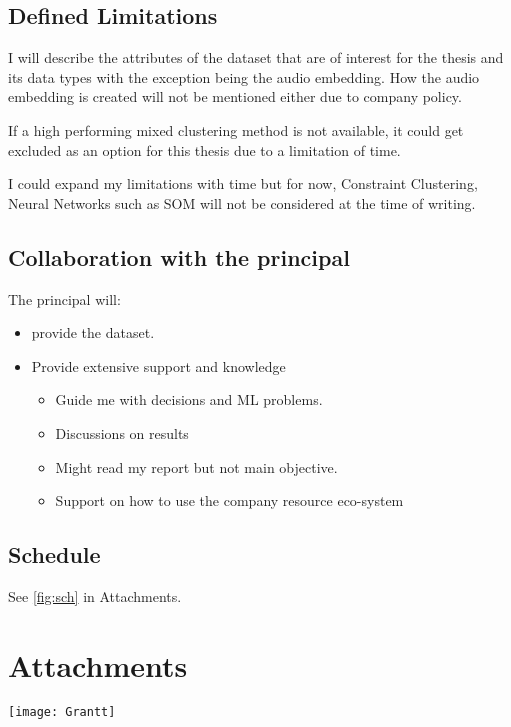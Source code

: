 \documentclass[a4paper,11pt]{article}
\begin{document}
\subsection{Defined Limitations}

I will describe the attributes of the dataset that are of interest for
the thesis and its data types with the exception being the audio
embedding. How the audio embedding is created will not be mentioned
either due to company policy.

If a high performing mixed clustering method is not available, it could get excluded as an option for this thesis due to a limitation of time.

I could expand my limitations with time but for now, Constraint
Clustering, Neural Networks such as SOM will not be considered at the
time of writing.

\subsection{Collaboration with the principal}

The principal will:

\begin{itemize}
\item
  provide the dataset.
\item
  Provide extensive support and knowledge
  \begin{itemize}
    \item
      Guide me with decisions and ML problems.
    \item
      Discussions on results
    \item
      Might read my report but not main objective.
    \item
      Support on how to use the company resource eco-system
  \end{itemize}
\end{itemize}

\subsection{Schedule}
See \ref{fig:sch} in Attachments.

\newpage
\printbibliography[heading=bibintoc]
\newpage

\section*{Attachments}

\newpage
\thispagestyle{plain}
\begin{sidewaysfigure}[h!]
\texttt{[image: Grantt]}
\caption{Preliminary Schedule}
\label{fig:sch}
\end{sidewaysfigure}
\newpage
\end{document}

